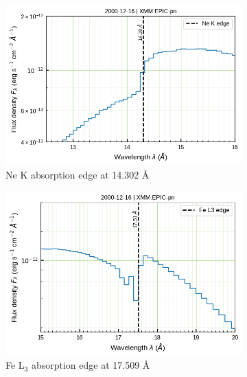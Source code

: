     \begin{figure}[!bht]
        \centering
        \begin{subfigure}[b]{0.45\textwidth}
            \includegraphics[width=\textwidth]{figures/eufspec/mr-vel-XMM-EPIC-pn-uf-Ne-edges.png}
            \caption{Ne K absorption edge at 14.302 \AA}
            \label{fig:pn-uf:Ne-edges}
        \end{subfigure}
        \hfill
        \begin{subfigure}[b]{0.45\textwidth}
            \includegraphics[width=\textwidth]{figures/eufspec/mr-vel-XMM-EPIC-pn-uf-Fe-edges.png}
            \caption{Fe L$_3$ absorption edge at 17.509 \AA}
            \label{fig:pn-uf:Fe-edges}
        \end{subfigure}
        \begin{subfigure}[b]{0.45\textwidth}

\end{subfigure}
\end{figure}
